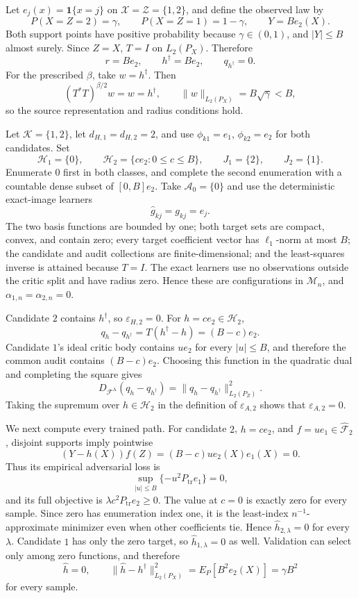 Let \(e_j(x)=\mathbf 1\{x=j\}\) on \(\mathcal X=\mathcal Z=\{1,2\}\), and define the observed law by
\[
 P(X=Z=2)=\gamma,
 \qquad
 P(X=Z=1)=1-\gamma,
 \qquad
 Y=B e_2(X).
\]
Both support points have positive probability because \(\gamma\in(0,1)\), and \(|Y|\le B\) almost surely. Since \(Z=X\), \(T=I\) on \(L_2(P_X)\). Therefore
\[
 r=B e_2,
 \qquad
 h^\dagger=B e_2,
 \qquad
 q_{h^\dagger}=0.
\]
For the prescribed \(\beta\), take \(w=h^\dagger\). Then
\[
 (T^*T)^{\beta/2}w=w=h^\dagger,
 \qquad
 \|w\|_{L_2(P_X)}=B\sqrt\gamma<B,
\]
so the source representation and radius conditions hold.

Let \(\mathcal K=\{1,2\}\), let \(d_{H,1}=d_{H,2}=2\), and use \(\phi_{k1}=e_1\), \(\phi_{k2}=e_2\) for both candidates. Set
\[
 \mathcal H_1=\{0\},
 \qquad
 \mathcal H_2=\{c e_2:0\le c\le B\},
 \qquad
 J_1=\{2\},
 \qquad
 J_2=\{1\}.
\]
Enumerate \(0\) first in both classes, and complete the second enumeration with a countable dense subset of \([0,B]e_2\). Take \(\mathcal A_0=\{0\}\) and use the deterministic exact-image learners
\[
 \widehat g_{kj}=g_{kj}=e_j.
\]
The two basis functions are bounded by one; both target sets are compact, convex, and contain zero; every target coefficient vector has \(\ell_1\)-norm at most \(B\); the candidate and audit collections are finite-dimensional; and the least-squares inverse is attained because \(T=I\). The exact learners use no observations outside the critic split and have radius zero. Hence these are configurations in \(\mathcal M_n\), and \(\alpha_{1,n}=\alpha_{2,n}=0\).

Candidate \(2\) contains \(h^\dagger\), so \(\varepsilon_{H,2}=0\). For \(h=c e_2\in\mathcal H_2\),
\[
 q_h-q_{h^\dagger}=T(h^\dagger-h)=(B-c)e_2.
\]
Candidate \(1\)'s ideal critic body contains \(u e_2\) for every \(|u|\le B\), and therefore the common audit contains \((B-c)e_2\). Choosing this function in the quadratic dual and completing the square gives
\[
 D_{\mathcal F^{\mathrm A}}(q_h-q_{h^\dagger})
 =\|q_h-q_{h^\dagger}\|_{L_2(P_Z)}^2.
\]
Taking the supremum over \(h\in\mathcal H_2\) in the definition of \(\varepsilon_{A,2}\) shows that \(\varepsilon_{A,2}=0\).

We next compute every trained path. For candidate \(2\), \(h=c e_2\), and \(f=u e_1\in\widehat{\mathcal F}_2\), disjoint supports imply pointwise
\[
 (Y-h(X))f(Z)=(B-c)u e_2(X)e_1(X)=0.
\]
Thus its empirical adversarial loss is
\[
 \sup_{|u|\le B}\{-u^2P_{\mathrm{tr}}e_1\}=0,
\]
and its full objective is \(\lambda c^2P_{\mathrm{tr}}e_2\ge0\). The value at \(c=0\) is exactly zero for every sample. Since zero has enumeration index one, it is the least-index \(n^{-1}\)-approximate minimizer even when other coefficients tie. Hence \(\widehat h_{2,\lambda}=0\) for every \(\lambda\). Candidate \(1\) has only the zero target, so \(\widehat h_{1,\lambda}=0\) as well. Validation can select only among zero functions, and therefore
\[
 \widehat h=0,
 \qquad
 \|\widehat h-h^\dagger\|_{L_2(P_X)}^2
 =E_P[B^2e_2(X)]=\gamma B^2
\]
for every sample.

